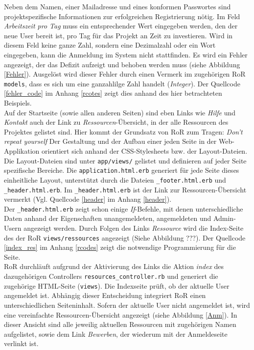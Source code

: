 \documentclass[a4paper,12pt,parskip,bibtotoc,liststotoc]{article}
\begin{document}
Neben dem Namen, einer Mailadresse und eines konformen Passwortes sind projektspezifische Informationen zur erfolgreichen Registrierung nötig. Im Feld \textit{Arbeitszeit pro Tag} muss ein entsprechender Wert eingegeben werden, den der neue User bereit ist, pro Tag für das Projekt an Zeit zu investieren. Wird in diesem Feld keine ganze Zahl, sondern eine Dezimalzahl oder ein Wort eingegeben, kann die Anmeldung im System nicht stattfinden. Es wird ein Fehler angezeigt, der das Defizit aufzeigt und behoben werden muss (siehe Abbildung \ref{Fehler}). Ausgelöst wird dieser Fehler durch einen Vermerk im zugehörigen RoR \texttt{models}, dass es sich um eine ganzahlilge Zahl handelt (\textit{Integer}). Der Quellcode \ref{fehler_code} im Anhang \ref{rcotes} zeigt dies anhand des hier betrachteten Beispiels.\\

Auf der Startseite (sowie allen anderen Seiten) sind eben Links wie \textit{Hilfe} und \textit{Kontakt} auch der Link zu \textit{Ressourcen}-Übersicht, in der alle Ressourcen des Projektes gelistet sind. Hier kommt der Grundsatz von RoR zum Tragen: \textit{Don’t repeat yourself} Der Gestaltung und der Aufbau einer jeden Seite in der Web-Applikation orientiert sich anhand der CSS-Stylesheets bzw. der Layout-Dateien. Die Layout-Dateien sind unter \texttt{app/views/} gelistet und definieren auf jeder Seite spezifische Bereiche. Die \texttt{application.html.erb} generiert für jede Seite dieses einheitliche Layout, unterstützt durch die Dateien \texttt{\_footer.html.erb} und \texttt{\_header.html.erb}. Im \texttt{\_header.html.erb} ist der Link zur Ressourcen-Übersicht vermerkt (Vgl. Quellcode \ref{header} im Anhang \ref{header}).\\

Der \texttt{\_header.html.erb} zeigt schon einige \textit{If}-Befehle, mit denen unterschiedliche Daten anhand der Eigenschaften unangemeldeten, angemeldeten und Admin-Usern angezeigt werden. Durch Folgen des Links \textit{Ressource} wird die Index-Seite des der RoR \texttt{views/ressources} angezeigt (Siehe Abbildung ???). Der Quellcode \ref{index_res} im Anhang \ref{rcodes} zeigt die notwendige Programmierung für die Seite.\\

RoR durchläuft aufgrund der Aktivierung des Links die Aktion \textit{index} des dazugehörigen Controllers \texttt{resources\_controller.rb} und generiert die zugehörige HTML-Seite (\texttt{views}). Die Indexseite prüft, ob der aktuelle User angemeldet ist. Abhängig dieser Entscheidung integriert RoR einen unterschiedlichen Seiteninhalt. Sofern der aktuelle User nicht angemeldet ist, wird eine vereinfachte Ressourcen-Übersicht angezeigt (siehe Abbildung \ref{Anm}). In dieser Ansicht sind alle jeweilig aktuellen Ressourcen mit zugehörigen Namen aufgelistet, sowie dem Link \textit{Bewerben}, der wiederum mit der Anmeldeseite verlinkt ist.\\
\end{document}
